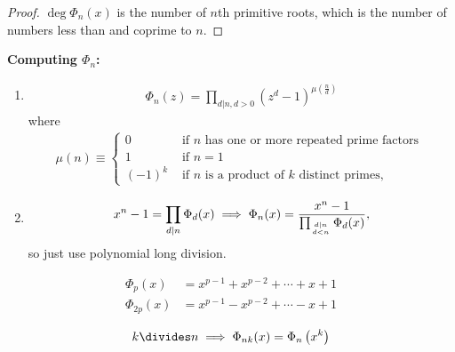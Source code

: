 \begin{proof}

\(\deg \Phi_n(x)\) is the number of \(n\)th primitive roots, which is
the number of numbers less than and coprime to \(n\).

\end{proof}

\textbf{Computing \(\Phi_n\):}

\begin{enumerate}
\def\labelenumi{\arabic{enumi}.}
\item

  \begin{align*}
  \Phi_{n}(z)=\prod_{d | n, d>0}\left(z^{d}-1\right)^{\mu\left(\frac{n}{d}\right)}
  \end{align*}
  where
  \begin{align*}
  \mu(n) \equiv\left\{ \begin{array}{ll}{0} & {\text { if } n \text { has one or more repeated prime factors }} \\ {1} & {\text { if } n=1} \\ {(-1)^{k}} & {\text { if } n \text { is a product of } k \text { distinct primes, }}\end{array}\right.
  \end{align*}
\item

  \begin{align*}
  x^{n}-1=\prod_{d | n} \Phi_{d}(x) \implies \Phi_n(x) = \frac{x^n-1}{\prod_{d | n \atop d < n} \Phi_{d}(x)},
  \end{align*}
  so just use polynomial long division.
\end{enumerate}

\begin{proposition}

\begin{align*}
\Phi_{p}(x)   &=  x^{p-1}+x^{p-2}+\cdots+x+1 \\
\Phi_{2 p}(x) &=  x^{p-1}-x^{p-2}+\cdots-x+1
\end{align*}

\end{proposition}

\begin{proposition}

\begin{align*}
k\divides n \implies \Phi_{n k}(x)=\Phi_{n}\left(x^{k}\right)
\end{align*}

\end{proposition}

